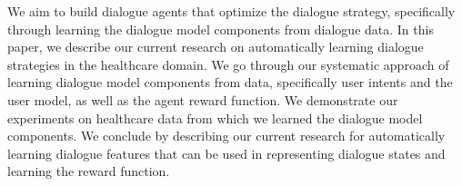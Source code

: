 We aim to build dialogue agents that optimize the dialogue strategy, specifically through learning the dialogue model components from dialogue data. In this paper, we describe our                          current research on automatically learning dialogue strategies in the healthcare domain. We go through our systematic approach of learning dialogue model components from data, specifically user intents and the user model,  as well as the agent reward function.  We demonstrate our experiments on healthcare data from which we learned the dialogue model components. We conclude by describing our current research for automatically learning dialogue features that can be used in representing dialogue states and learning the reward function.
